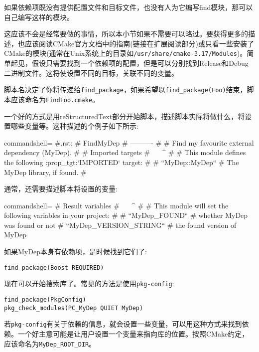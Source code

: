
如果依赖项既没有提供配置文件和目标文件，也没有人为它编写find模块，那可以自己编写这样的模块。

这应该不会是经常要做的事情，所以本小节如果不需要可以略过。要获得更多的描述，也应该阅读CMake官方文档中的指南(链接在扩展阅读部分)或只看一些安装了CMake的模块(通常在Unix系统上的目录如\texttt{/usr/share/cmake-3.17/Modules})。简单起见，假设只需要找到一个依赖项的配置，但是可以分别找到Release和Debug二进制文件。这将使设置不同的目标，关联不同的变量。

脚本名决定了你将传递给\texttt{find\_package}，如果希望以\texttt{find\_package(Foo)}结束，脚本应该命名为\texttt{FindFoo.cmake}。

一个好的方式是用reStructuredText部分开始脚本，描述脚本实际将做什么，将设置哪些变量等。这种描述的个例子如下所示:

\begin{tcblisting}{commandshell={}}
#.rst:
# FindMyDep
# ----------
#
# Find my favourite external dependency (MyDep).
#
# Imported targets
# ^^^^^^^^^^^^^^^^
#
# This module defines the following :prop_tgt:`IMPORTED` target:
#
# ``MyDep::MyDep``
# The MyDep library, if found.
#
\end{tcblisting}

通常，还需要描述脚本将设置的变量:

\begin{tcblisting}{commandshell={}}
# Result variables
# ^^^^^^^^^^^^^^^^
#
# This module will set the following variables in your project:
#
# ``MyDep_FOUND``
# whether MyDep was found or not
# ``MyDep_VERSION_STRING``
# the found version of MyDep
\end{tcblisting}

如果MyDep本身有依赖项，是时候找到它们了:

\begin{lstlisting}[style=styleCMake]
find_package(Boost REQUIRED)
\end{lstlisting}

现在可以开始搜索库了。常见的方法是使用\texttt{pkg-config}:

\begin{lstlisting}[style=styleCMake]
find_package(PkgConfig)
pkg_check_modules(PC_MyDep QUIET MyDep)
\end{lstlisting}

若\texttt{pkg-config}有关于依赖的信息，就会设置一些变量，可以用这种方式来找到依赖。一个好主意可能是让用户设置一个变量来指向库的位置。按照CMake约定，应该命名为\texttt{MyDep\_ROOT\_DIR}。

